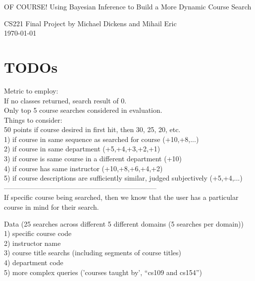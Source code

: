 \documentclass[12pt]{article}
\begin{document}
\begin{center}
{\Large OF COURSE! Using Bayesian Inference to Build a More Dynamic Course Search}
\begin{center}
{\normalsize CS221 Final Project by Michael Dickens and Mihail Eric}\\
\today 
\end{center}

\end{center}



\section*{TODOs}

%
Metric to employ: \\
If no classes returned, search result of 0.\\

Only top 5 course searches considered in evaluation.\\

Things to consider:\\
50 points if course desired in first hit, then 30, 25, 20, etc.\\
1) if course in same sequence as searched for course (+10,+8,...)\\
2) if course in same department (+5,+4,+3,+2,+1)\\
3) if course is same course in a different department (+10)\\
4) if course has same instructor (+10,+8,+6,+4,+2)\\
5) if course descriptions are sufficiently similar, judged subjectively (+5,+4,...)\\
------------------------------------------------------------------\\
If specific course being searched, then we know that the user has a particular course in mind for their search.

Data (25 searches across different 5 different domains (5 searches per domain))\\
1) specific course code\\
2) instructor name\\
3) course title searchs (including segments of course titles)\\
4) department code\\
5) more complex queries ('courses taught by', ``cs109 and cs154'')
\end{document}
